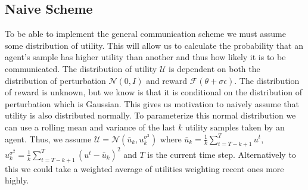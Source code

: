 

\subsection{Naive Scheme}
\label{sec:NaiveScheme}

To be able to implement the general communication scheme we must assume some distribution of utility. This will allow us to calculate the probability that an agent's sample has higher utility than another and thus how likely it is to be communicated. The distribution of utility $\mathcal{U}$ is dependent on both the distribution of perturbation $\mathcal{N}(0,I)$ and reward $\mathcal{F}(\theta +\sigma \epsilon)$. The distribution of reward is unknown, but we know is that it is conditional on the distribution of perturbation which is Gaussian. This gives us motivation to naively assume that utility is also distributed normally. To parameterize this normal distribution we can use a rolling mean and variance of the last $k$ utility samples taken by an agent. Thus, we assume $\mathcal{U} = \mathcal{N}(\bar{u}_k, u^{\sigma^2}_k)$ where $\bar{u}_k = \frac{1}{k} \sum_{t=T-k+1}^T u^t$, $u^{\sigma^2}_k = \frac{1}{k}\sum_{t=T-k+1}^T (u^t - \bar{u}_k)^2$ and $T$ is the current time step. Alternatively to this we could take a weighted average of utilities weighting recent ones more highly.


